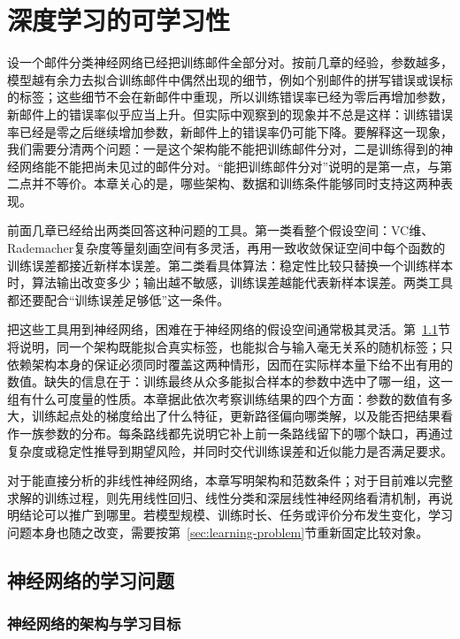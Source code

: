 \chapter{深度学习的可学习性}
\label{chap:deep-learning-theory}

设一个邮件分类神经网络已经把训练邮件全部分对。按前几章的经验，参数越多，模型越有余力去拟合训练邮件中偶然出现的细节，例如个别邮件的拼写错误或误标的标签；这些细节不会在新邮件中重现，所以训练错误率已经为零后再增加参数，新邮件上的错误率似乎应当上升。但实际中观察到的现象并不总是这样：训练错误率已经是零之后继续增加参数，新邮件上的错误率仍可能下降。要解释这一现象，我们需要分清两个问题：一是这个架构能不能把训练邮件分对，二是训练得到的神经网络能不能把尚未见过的邮件分对。“能把训练邮件分对”说明的是第一点，与第二点并不等价。本章关心的是，哪些架构、数据和训练条件能够同时支持这两种表现。

前面几章已经给出两类回答这种问题的工具。第一类看整个假设空间：VC维、Rademacher复杂度等量刻画空间有多灵活，再用一致收敛保证空间中每个函数的训练误差都接近新样本误差。第二类看具体算法：稳定性比较只替换一个训练样本时，算法输出改变多少；输出越不敏感，训练误差越能代表新样本误差。两类工具都还要配合“训练误差足够低”这一条件。

把这些工具用到神经网络，困难在于神经网络的假设空间通常极其灵活。第~\ref{sec:network-learning-problem}节将说明，同一个架构既能拟合真实标签，也能拟合与输入毫无关系的随机标签；只依赖架构本身的保证必须同时覆盖这两种情形，因而在实际样本量下给不出有用的数值。缺失的信息在于：训练最终从众多能拟合样本的参数中选中了哪一组，这一组有什么可度量的性质。本章据此依次考察训练结果的四个方面：参数的数值有多大，训练起点处的梯度给出了什么特征，更新路径偏向哪类解，以及能否把结果看作一族参数的分布。每条路线都先说明它补上前一条路线留下的哪个缺口，再通过复杂度或稳定性推导到期望风险，并同时交代训练误差和近似能力是否满足要求。

对于能直接分析的非线性神经网络，本章写明架构和范数条件；对于目前难以完整求解的训练过程，则先用线性回归、线性分类和深层线性神经网络看清机制，再说明结论可以推广到哪里。若模型规模、训练时长、任务或评价分布发生变化，学习问题本身也随之改变，需要按第~\ref{sec:learning-problem}节重新固定比较对象。

\section{神经网络的学习问题}
\label{sec:network-learning-problem}

\subsection{神经网络的架构与学习目标}

